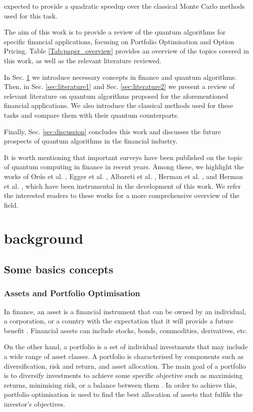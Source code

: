 \documentclass[prx,twocolumn,floatfix,superscriptaddress,longbibliography]{revtex4-1}
\begin{document}
expected to provide a quadratic speedup over the classical Monte Carlo methods used for this task. 

The aim of this work is to provide a review of the quantum algorithms for specific financial applications, focusing on Portfolio Optimisation and Option Pricing. Table \ref{Tab:paper_overview} provides an overview of the topics covered in this work, as well as the relevant literature reviewed. 

In Sec. \ref{sec:background} we introduce necessary concepts in finance and quantum algorithms. Then, in Sec. \ref{sec:literature1} and Sec. \ref{sec:literature2}  we present a review of relevant literature on quantum algorithms proposed for the aforementioned financial applications. We also 
  introduce the classical methods used for these tasks and compare them with their quantum counterparts.

 Finally, Sec. \ref{sec:discussion} concludes this work and discusses the future prospects of quantum algorithms in the financial industry. 

It is worth mentioning that important surveys have been published on the topic of quantum computing in finance in recent years. Among these, we highlight the works of Orús et al. \cite{Orus2019}, Egger et al. \cite{Egger2020a}, Albareti et al. \cite{Albareti2022}, Herman et al. \cite{Herman2022}, and Herman et al. \cite{Herman2023}, which have been instrumental in the development of this work. We refer the interested readers to these works for a more comprehensive overview of the field.

\section{background}\label{sec:background}
\subsection{Some basics concepts}
\subsubsection{Assets and Portfolio Optimisation}

In finance, an asset is a financial instrument that can be owned by an individual, a corporation, or a country with the expectation that it will provide a future benefit \cite{2023}. Financial assets can include stocks, bonds, commodities, derivatives, etc. 

On the other hand, a portfolio is a set of individual investments that may include a wide range of asset classes. A portfolio is characterised by components such as diversification, risk and return, and asset allocation. The main goal of a portfolio is to diversify investments to achieve some specific objective such as maximising returns, minimising risk, or a balance between them \cite{Wilmott2007}. 
In order to achieve this, portfolio optimisation is used to find the best allocation of assets that fulfils the investor's objectives.
\end{document}
